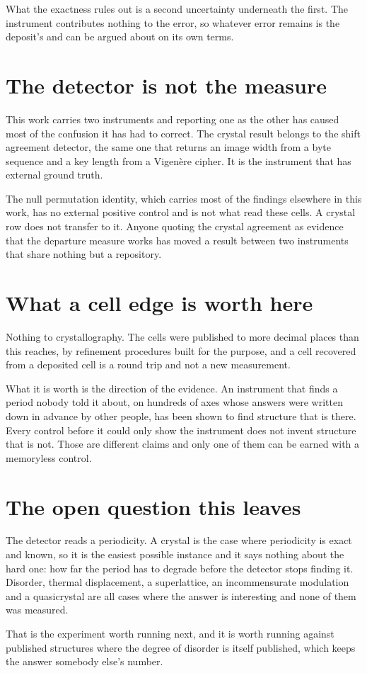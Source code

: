 What the exactness rules out is a second uncertainty underneath the first. The instrument contributes nothing to the error, so whatever error remains is the deposit's and can be argued about on its own terms.

\section{The detector is not the measure}

This work carries two instruments and reporting one as the other has caused most of the confusion it has had to correct. The crystal result belongs to the shift agreement detector, the same one that returns an image width from a byte sequence and a key length from a Vigenère cipher. It is the instrument that has external ground truth.

The null permutation identity, which carries most of the findings elsewhere in this work, has no external positive control and is not what read these cells. A crystal row does not transfer to it. Anyone quoting the crystal agreement as evidence that the departure measure works has moved a result between two instruments that share nothing but a repository.

\section{What a cell edge is worth here}

Nothing to crystallography. The cells were published to more decimal places than this reaches, by refinement procedures built for the purpose, and a cell recovered from a deposited cell is a round trip and not a new measurement.

What it is worth is the direction of the evidence. An instrument that finds a period nobody told it about, on hundreds of axes whose answers were written down in advance by other people, has been shown to find structure that is there. Every control before it could only show the instrument does not invent structure that is not. Those are different claims and only one of them can be earned with a memoryless control.

\section{The open question this leaves}

The detector reads a periodicity. A crystal is the case where periodicity is exact and known, so it is the easiest possible instance and it says nothing about the hard one: how far the period has to degrade before the detector stops finding it. Disorder, thermal displacement, a superlattice, an incommensurate modulation and a quasicrystal are all cases where the answer is interesting and none of them was measured.

That is the experiment worth running next, and it is worth running against published structures where the degree of disorder is itself published, which keeps the answer somebody else's number.
